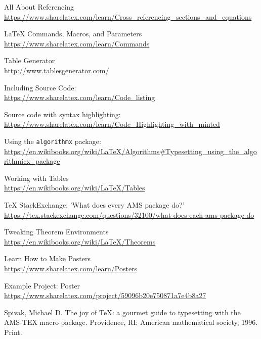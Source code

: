 \documentclass[11pt,letterpaper,titlepage]{article}
\numberwithin{equation}{section}
\numberwithin{figure}{section}
\numberwithin{table}{section}
\numberwithin{algorithm}{section}
\theoremstyle{definition}
\begin{document}
\begin{thebibliography}{20}

All About Referencing\\
\url{https://www.sharelatex.com/learn/Cross\_referencing\_sections\_and\_equations}

{\LaTeX} Commands, Macros, and Parameters\\
\url{https://www.sharelatex.com/learn/Commands}

Table Generator\\
\url{http://www.tablesgenerator.com/}

Including Source Code:\\
\url{https://www.sharelatex.com/learn/Code\_listing}

Source code with syntax highlighting:\\ \url{https://www.sharelatex.com/learn/Code\_Highlighting\_with\_minted}

Using the \verb$algorithmx$ package:
\url{https://en.wikibooks.org/wiki/LaTeX/Algorithms#Typesetting_using_the_algorithmicx_package}

Working with Tables\\ \url{https://en.wikibooks.org/wiki/LaTeX/Tables}

{\TeX} StackExchange: 'What does every AMS package do?'\\ \url{https://tex.stackexchange.com/questions/32100/what-does-each-ams-package-do}

Tweaking Theorem Environments\\ \url{https://en.wikibooks.org/wiki/LaTeX/Theorems}

Learn How to Make Posters\\
\url{https://www.sharelatex.com/learn/Posters}

Example Project: Poster\\
\url{https://www.sharelatex.com/project/59096b20e750871a7e4b8a27}

Spivak, Michael D. The joy of {\TeX}: a gourmet guide to typesetting with the AMS-TEX macro package. Providence, RI: American mathematical society, 1996. Print.

\end{thebibliography}
\end{document}
